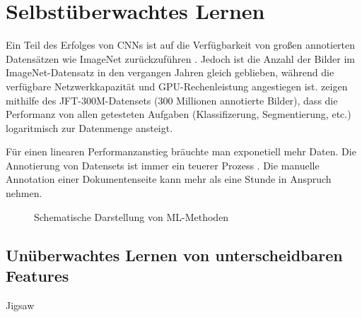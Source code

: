 \chapter{Selbstüberwachtes Lernen}
\label{chap:selfsupervised}
Ein Teil des Erfolges von CNNs ist auf die Verfügbarkeit von großen annotierten Datensätzen wie ImageNet zurückzuführen
\autocite{SunRevisitingUnreasonableEffectiveness2017}.
Jedoch ist die Anzahl der Bilder im ImageNet-Datensatz in den vergangen Jahren gleich geblieben, während die  verfügbare Netzwerkkapazität und GPU-Rechenleistung angestiegen ist.
\citeauthor{SunRevisitingUnreasonableEffectiveness2017} zeigen mithilfe des JFT-300M-Datensets (300 Millionen annotierte Bilder), dass die Performanz von allen getesteten Aufgaben (Klassifizerung, Segmentierung, etc.)
logaritmisch zur Datenmenge ansteigt. 

Für einen linearen Performanzanstieg bräuchte man exponetiell mehr Daten.
Die Annotierung von Datensets ist immer ein teuerer Prozess \autocite[988]{ValvenyDatasetsAnnotationsDocument2014}.
Die manuelle Annotation einer Dokumentenseite kann mehr als eine Stunde in Anspruch nehmen. 




\begin{figure}[htbp!]
    \centering
    \caption{Schematische Darstellung von ML-Methoden}
    \label{fig:all}
    
    
\end{figure}
\vspace{0.5cm}



\section{Unüberwachtes Lernen von unterscheidbaren Features}


Jigsaw
\cite{NorooziUnsupervisedLearningVisual2016}
